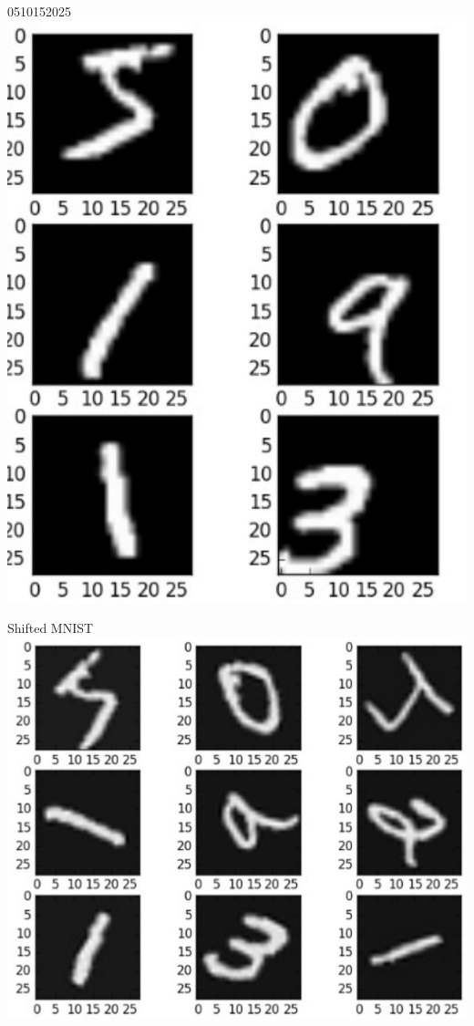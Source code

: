 \documentclass[10pt]{article}
\begin{document}
0510152025
\includegraphics[max width=\textwidth, center]{2024_01_08_959e2db67a31f073f6d2g-23(1)}

Shifted MNIST
\includegraphics[max width=\textwidth, center]{2024_01_08_959e2db67a31f073f6d2g-23(3)}
\end{document}
